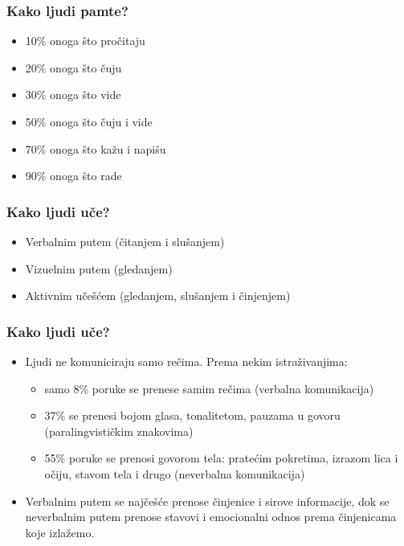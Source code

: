 \documentclass{beamer}
\begin{document}
\begin{frame}[fragile]\frametitle{Kako ljudi pamte?}
	\begin{itemize}	
		\item 10\% onoga što pročitaju
		\item 20\% onoga što čuju
		\item 30\% onoga što vide
		\item 50\% onoga što čuju i vide
		\item 70\% onoga što kažu i napišu
		\item 90\% onoga što rade
	\end{itemize}
\end{frame}

\begin{frame}[fragile]\frametitle{Kako ljudi uče?}
	\begin{itemize}	
		\item Verbalnim putem (čitanjem i slušanjem)
		\item Vizuelnim putem (gledanjem)
		\item Aktivnim učešćem (gledanjem, slušanjem i činjenjem)
	\end{itemize}
\end{frame}

\begin{frame}[fragile]\frametitle{Kako ljudi uče?}
	\begin{itemize}	
		\item Ljudi ne komuniciraju samo rečima. Prema nekim
		istraživanjima:
		\begin{itemize}
			\item samo 8\% poruke se prenese samim rečima (verbalna komunikacija)
			\item 37\% se prenesi bojom glasa, tonalitetom, pauzama u govoru (paralingvističkim znakovima)
			\item 55\% poruke se prenosi govorom tela: pratećim pokretima, izrazom lica i
			očiju, stavom tela i drugo (neverbalna komunikacija)
		\end{itemize}
		\item Verbalnim putem se najčešće prenose činjenice i
		sirove informacije, dok se neverbalnim putem prenose stavovi i
		emocionalni odnos prema činjenicama koje izlažemo.
	\end{itemize}
\end{frame}
\end{document}
